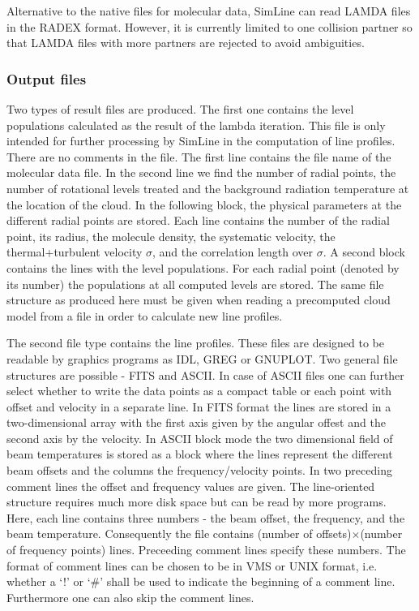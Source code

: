 Alternative to the native files for molecular data, SimLine can read
LAMDA files in the RADEX format. However, it is currently limited to 
one collision partner so that LAMDA files with more partners are
rejected to avoid ambiguities.

\subsubsection{Output files}

Two types of result files are produced. The first one contains the
level populations calculated as the result of the lambda iteration.
This file is only intended for further processing by SimLine in the 
computation of line profiles.
There are no comments in the file. The first line contains the
file name of the molecular data file. In the second line we find
the number of radial points, the number of
rotational levels treated and the background radiation temperature
at the location of the cloud. In the following block, the physical
parameters at the different radial points are stored.
Each line contains the number of the radial point, its radius,
the molecule density, the systematic velocity, the 
thermal+turbulent velocity $\sigma$, and the correlation length over
$\sigma$. A second block contains the lines with the level 
populations. For each 
radial point (denoted by its number) the populations at all 
computed levels are stored.
The same file structure as produced here 
must be given when reading a precomputed cloud model from a file in order 
to calculate new line profiles.  

The second file type contains the line profiles. These files are designed
to be readable by graphics programs as IDL, GREG or GNUPLOT. Two general 
file structures are possible - FITS and ASCII. In case of ASCII files
one can further select whether to write the data points as a compact
table or each point with offset and velocity in a separate line.
In FITS format the lines are stored in a two-dimensional array
with the first axis given by the angular offest and the
second axis by the velocity. In ASCII block mode
the two dimensional field of beam temperatures
is stored as a block where the lines represent the different beam
offsets and the columns the frequency/velocity points. In two preceding
comment lines the offset and frequency values are given.
The line-oriented structure requires much more disk space but can be read by 
more programs. Here, each line contains three numbers - the beam offset,
the frequency, and the beam temperature. Consequently the file
contains (number of offsets)$\times$(number of frequency points) lines.
Preceeding comment lines specify these numbers.
The format of comment lines can be chosen to be in VMS or UNIX format,
i.e. whether a `!' or `\#' shall be used to indicate the beginning of 
a comment line. Furthermore one can also skip the comment lines.

